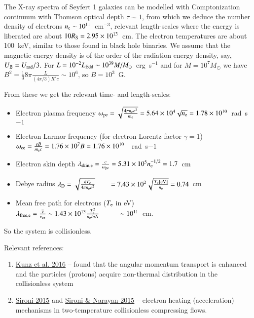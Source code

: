 \documentclass{aa}
\begin{document}
The X-ray spectra of Seyfert 1 galaxies can be modelled with Comptonization continuum with Thomson optical depth 
$\tau \sim 1$, from which we deduce the number density of electrons $n_{\rm e}\sim 10^{11}$~cm$^{-3}$, relevant 
length-scales where the energy is liberated are about $10R_{\rm S}=2.95\times10^{13}$~cm.
The electron temperatures are about 100~keV, similar to those found in black hole binaries.
We assume that the magnetic energy density is of the order of the radiation energy density, say, $U_{\rm B}=U_{\rm rad}/3$. 
For $L=10^{-2}L_{\rm Edd}\sim10^{39}M/M_{\odot}$~erg~s$^{-1}$ and for $M=10^7M_{\odot}$ we have 
$B^2 = \frac {1}{3} 8\pi \frac {L}{(4\pi/3) R^2 c}\sim 10^6$, so $B=10^3$~G.

From these we get the relevant time- and length-scales:
\begin{itemize}
\item Electron plasma frequency 
$\omega_{\rm pe} = \sqrt{ \frac{4\pi n_{\rm e} e^2}{m_{\rm e}} } 
                 = 5.64 \times 10^4 \sqrt{n_{\rm e}}=1.78\times10^{10}$~rad~s${-1}$
\item Electron Larmor frequency (for electron Lorentz factor $\gamma=1$)
$\omega_{\rm ce} = \frac {eB}{m_{\rm e}c} = 1.76 \times 10^7 B = 1.76\times10^{10}$~~rad~s${-1}$
\item Electron skin depth
$\lambda_{\rm skin,e} = \frac {c}{\omega_{\rm pe}} = 5.31\times10^5 n_{\rm e}^{-1/2} = 1.7$~cm
\item Debye radius
$\lambda_{\rm D} = \sqrt{ \frac {k T_{\rm e}}{4\pi n_{\rm e} e^2} } 
                 = 7.43\times10^2 \sqrt{ \frac {T_{\rm e} {\rm[eV]}}{n_{\rm e}}} = 0.74$~cm
\item Mean free path for electrons ($T_{\rm e}$ in eV)
$\lambda_{\rm free,e} = \frac {\overline{v}}{\nu_{\rm ee}} \sim 1.43\times 10^{13} \frac {T_{\rm e}^2}{n_{\rm e} ln\Lambda} 
                      \sim 10^{11}$~cm.
\end{itemize}
So the system is collisionless.



Relevant references: 
\begin{enumerate}
\item \href{http://adsabs.harvard.edu/abs/2016arXiv160807911K}{Kunz et al. 2016} -- found that the angular momentum transport  is enhanced and the particles (protons) acquire non-thermal distribution in the collisionless system
\item \href{http://adsabs.harvard.edu/abs/2015ApJ...800...89S}{Sironi 2015} 
and \href{http://adsabs.harvard.edu/abs/2015ApJ...800...88S}{Sironi \& Narayan 2015} -- electron heating (acceleration) mechanisms in two-temperature collisionless compressing flows.
\end{enumerate}
\end{document}
